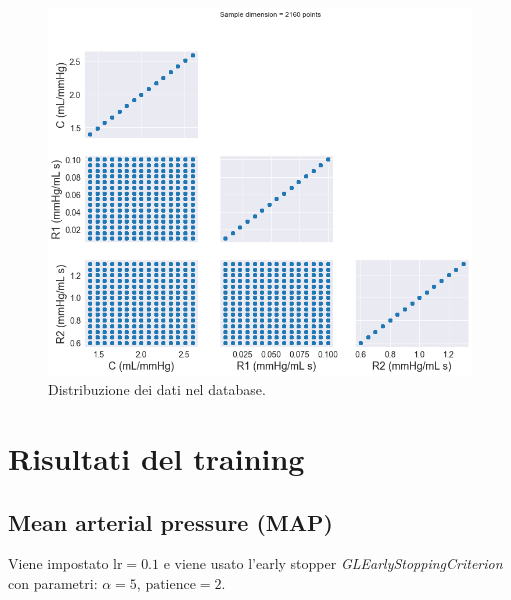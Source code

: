 \begin{figure}[h]
    \centering
    \includegraphics[width=1\textwidth]{images/Training (risultati)/database.png}
    \caption{Distribuzione dei dati nel database.}
    \label{distribuzioneDataset}
\end{figure}

\newpage
\section{Risultati del training}


\subsection{Mean arterial pressure (MAP)}
Viene impostato $\text{lr}=0.1$ e viene usato l'early stopper \textit{GLEarlyStoppingCriterion} con parametri: $\alpha = 5$, $\text{patience}=2$.


